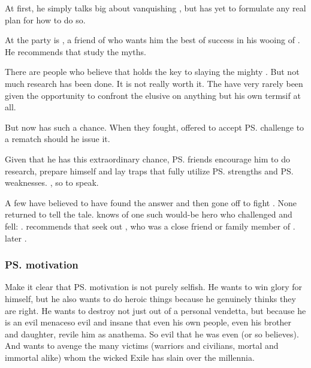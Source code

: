 \begin{garbage}
At first, he simply talks big about vanquishing \Ishnaruchaefir, but has yet to formulate any real plan for how to do so. 

At the party is \hs{\Menessiaraid}, a friend of \Teshrial{} who wants him the best of success in his wooing of \Firaxel. 
He recommends that \Teshrial{} study the myths. 

There are people who believe that \emph{\WanderersInDarkness} holds the key to slaying the mighty \dragonlord. 
But not much research has been done. 
It is not really worth it. 
The have \resphain{} very rarely been given the opportunity to confront the elusive \Ishnaruchaefir{} on anything but his own terms\dash if at all. 

But \Teshrial{} now has such a chance. 
When they fought, \Ishnaruchaefir{} {offered to accept \ps{\Teshrial} challenge to a rematch} should he issue it. 

Given that he has this extraordinary chance, \ps{\Teshrial} friends encourage him to do research, prepare himself and lay traps that fully utilize \ps{\Teshrial} strengths and \ps{\Ishnaruchaefir} weaknesses. 
, so to speak. 

A few have believed to have found the answer and then gone off to fight \Ishnaruchaefir{}. 
None returned to tell the tale. 
\Menessiaraid{} knows of one such would-be hero who challenged \Ishnaruchaefir{} and fell: 
\hs{\Lothagiel}. 
\Menessiaraid{} recommends that \Teshrial{} seek out \Nemuragh, who was a close friend or family member of \Lothagiel. 
\Teshrial{} later . 





\subsubsection{\ps{\Teshrial} motivation}
Make it clear that \ps{\Teshrial} motivation is not purely selfish. 
He wants to win glory for himself, but he also wants to do heroic things because he genuinely thinks they are right. 
He wants to destroy \Ishnaruchaefir{} not just out of a personal vendetta, but because he is an evil menace\dash so evil and insane that even his own people, even his brother and daughter, revile him as anathema. 
So evil that he was even  (or so \Teshrial{} believes). 
And \Teshrial{} wants to avenge the many victims (warriors and civilians, mortal and immortal alike) whom the wicked Exile has slain over the millennia. 


\end{garbage}
